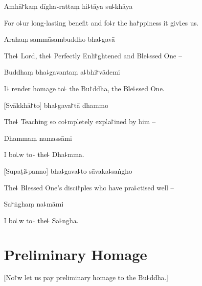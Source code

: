 Amhā꜓kaṃ dīgha꜕rattaṃ hi꜕tāya su꜕khāya

\begin{english}
For o꜕ur long-lasting benefit and fo꜕r the ha꜓ppiness it giv꜖es us.
\end{english}

\clearpage

Arahaṃ sammāsambuddho bha꜕gavā              %

\begin{english}
The꜕ Lord, the꜕ Perfectly Enli꜓ghtened and Ble꜕ssed One --
\end{english}

Buddhaṃ bha꜕gavantaṃ a꜕bhi꜓vādemi

\begin{english}
  I꜕ render homage to꜕ the Bu꜓ddha, the Ble꜕ssed One.
\end{english}

[Svākkhā꜓to] bha꜕gava꜓tā dhammo

\begin{english}
  The꜕ Teaching so co꜕mpletely expla꜓ined by him --
\end{english}

Dhammaṃ namassāmi

\begin{english}
  I bo꜖w to꜕ the꜕ Dha꜕mma.
\end{english}

[Supaṭi꜕panno] bha꜕gava꜕to sāvaka꜕saṅgho

\begin{english}
The꜕ Blessed One's disci꜓ples who have pra꜕ctised well --
\end{english}

Sa꜓ṅghaṃ na꜕māmi

\begin{english}
  I bo꜖w to꜕ the꜕ Sa꜕ngha.
\end{english}

\chapter{Preliminary Homage}            %

\begin{leader}
\end{leader}

\begin{english}
  [No꜓w let us pay preliminary homage to the Bu꜕ddha.]
\end{english}

